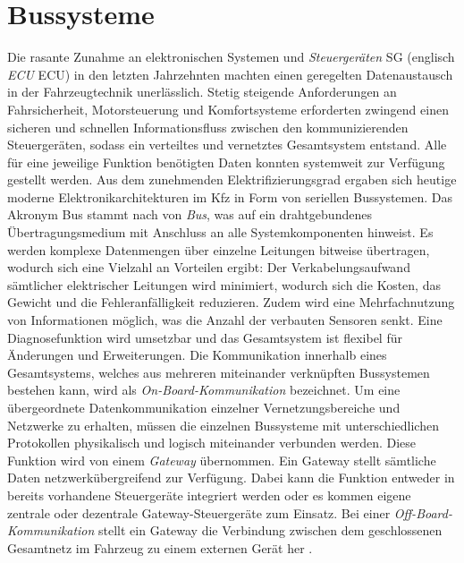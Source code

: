\section{Bussysteme} \label{sec:Bussysteme}
Die rasante Zunahme an elektronischen Systemen und \emph{Steuergeräten} \acs{SG} (englisch \emph{\acl{ECU}} \acs{ECU}) in den letzten Jahrzehnten machten einen geregelten Datenaustausch in der Fahrzeugtechnik unerlässlich. Stetig steigende Anforderungen an Fahrsicherheit, Motorsteuerung und Komfortsysteme erforderten zwingend einen sicheren und schnellen Informationsfluss zwischen den kommunizierenden Steuergeräten, sodass ein verteiltes und vernetztes Gesamtsystem entstand. Alle für eine jeweilige Funktion benötigten Daten konnten systemweit zur Verfügung gestellt werden. Aus dem zunehmenden Elektrifizierungsgrad ergaben sich heutige moderne Elektronikarchitekturen im Kfz in Form von seriellen Bussystemen. Das Akronym \acs{Bus} stammt \cite{Klumann.2000} nach von \emph{\acl{Bus}}, was auf ein drahtgebundenes Übertragungsmedium mit Anschluss an alle Systemkomponenten hinweist. Es werden komplexe Datenmengen über einzelne Leitungen bitweise übertragen, wodurch sich eine Vielzahl an Vorteilen ergibt: Der Verkabelungsaufwand sämtlicher elektrischer Leitungen wird minimiert, wodurch sich die Kosten, das Gewicht und die Fehleranfälligkeit reduzieren. Zudem wird eine Mehrfachnutzung von Informationen möglich, was die Anzahl der verbauten Sensoren senkt. Eine Diagnosefunktion wird umsetzbar und das Gesamtsystem ist flexibel für Änderungen und Erweiterungen. Die Kommunikation innerhalb eines Gesamtsystems, welches aus mehreren miteinander verknüpften Bussystemen bestehen kann, wird als \emph{On-Board-Kommunikation} bezeichnet. Um eine übergeordnete Datenkommunikation einzelner Vernetzungsbereiche und Netzwerke zu erhalten, müssen die einzelnen Bussysteme mit unterschiedlichen Protokollen physikalisch und logisch miteinander verbunden werden. Diese Funktion wird von einem \emph{Gateway} übernommen. Ein Gateway stellt sämtliche Daten netzwerkübergreifend zur Verfügung. Dabei kann die Funktion entweder in bereits vorhandene Steuergeräte integriert werden oder es kommen eigene zentrale oder dezentrale Gateway-Steuergeräte zum Einsatz. Bei einer \emph{Off-Board-Kommunikation} stellt ein Gateway die Verbindung zwischen dem geschlossenen Gesamtnetz im Fahrzeug zu einem externen Gerät her \cite{VectorInformatikGmbH.b}.

